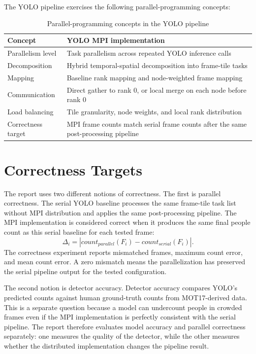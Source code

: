 The YOLO pipeline exercises the following parallel-programming concepts:
\begin{table}[H]
\centering
\caption{Parallel-programming concepts in the YOLO pipeline}
\label{tab:yolo-concepts}
\begin{tabularx}{\textwidth}{L{3.2cm} X}
\toprule
Concept & YOLO MPI implementation \\
\midrule
Parallelism level & Task parallelism across repeated YOLO inference calls \\
Decomposition & Hybrid temporal-spatial decomposition into frame-tile tasks \\
Mapping & Baseline rank mapping and node-weighted frame mapping \\
Communication & Direct gather to rank 0, or local merge on each node before rank 0 \\
Load balancing & Tile granularity, node weights, and local rank distribution \\
Correctness target & MPI frame counts match serial frame counts after the same post-processing pipeline \\
\bottomrule
\end{tabularx}
\end{table}

\section{Correctness Targets}
The report uses two different notions of correctness. The first is parallel correctness. The serial YOLO baseline processes the same frame-tile task list without MPI distribution and applies the same post-processing pipeline. The MPI implementation is considered correct when it produces the same final people count as this serial baseline for each tested frame:
\begin{equation}
    \Delta_i = |count_{parallel}(F_i) - count_{serial}(F_i)|.
\end{equation}
The correctness experiment reports mismatched frames, maximum count error, and mean count error. A zero mismatch means the parallelization has preserved the serial pipeline output for the tested configuration.

The second notion is detector accuracy. Detector accuracy compares YOLO's predicted counts against human ground-truth counts from MOT17-derived data. This is a separate question because a model can undercount people in crowded frames even if the MPI implementation is perfectly consistent with the serial pipeline. The report therefore evaluates model accuracy and parallel correctness separately: one measures the quality of the detector, while the other measures whether the distributed implementation changes the pipeline result.
